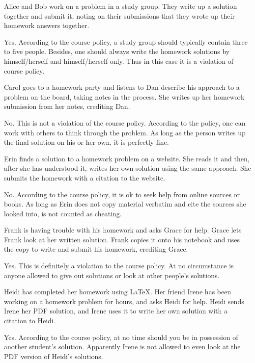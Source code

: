 \documentclass[11pt]{article}
\begin{document}
\begin{Parts}
	\Part Alice and Bob work on a problem in a study group. They write up a solution together and submit it, noting on their submissions that they wrote up their homework answers together. 
	\begin{Answer}
		Yes. According to the course policy, a study group should typically
		contain three to five people. Besides, one should always write the 
		homework solutions by himself/herself and himself/herself only. Thus 
		in this case it is a violation of course policy.
	\end{Answer}
	
	\Part Carol goes to a homework party and listens to Dan describe his approach to a problem on the board, taking notes in the process. She writes up her homework submission from her notes, crediting Dan.
	\begin{Answer}
		No. This is not a violation of the course policy. According to the
		policy, one can work with others to think through the problem. As long 
		as the person writes up the final solution on his or her own, it is 
		perfectly fine. 
	\end{Answer}
	\Part Erin finds a solution to a homework problem on a website. She reads it and then, after she has understood it, writes her own solution using the same approach. She submits the homework with a citation to the website.
	
	\begin{Answer}
		No. According to the course policy, it is ok to seek help from online 
		sources or books. As long as Erin does not copy material verbatim and 
		cite the sources she looked into, is not counted as cheating.
	\end{Answer}
	
	\Part Frank is having trouble with his homework and asks Grace for help. Grace lets Frank look at her written solution. Frank copies it onto his notebook and uses the copy to write and submit his homework, crediting Grace.
	\begin{Answer}
		Yes. This is definitely a violation to the course policy. At no circumstance
			is anyone allowed to give out solutions or look at other people's solutions.
	\end{Answer}
	
	\Part Heidi has completed her homework using \LaTeX. Her friend Irene has been working on a homework problem for hours, and asks Heidi for help. Heidi sends Irene her PDF solution, and Irene uses it to write her own solution with a citation to Heidi.
	\begin{Answer}
		Yes. According to the course policy, at no time should you be in possession 
		of another student's solution. Apparently Irene is not allowed to even
		look at the PDF version of Heidi's solutions.
	\end{Answer}
	
\end{Parts}
\end{document}
